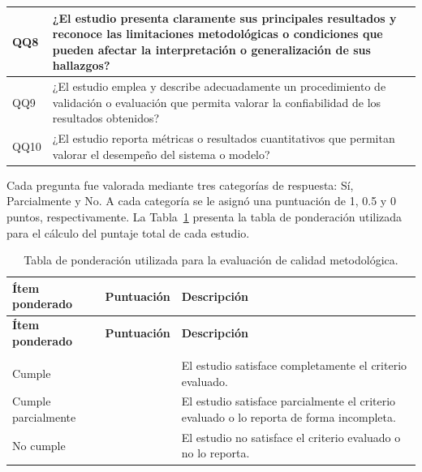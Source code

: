 \documentclass{iaesarticle}
\begin{document}
\begin{longtable}{%
    |>{\centering\arraybackslash}p{}%
    |>{\raggedright\arraybackslash}p{}|}
QQ8 &
¿El estudio presenta claramente sus principales resultados y reconoce las limitaciones metodológicas o condiciones que pueden afectar la interpretación o generalización de sus hallazgos? \\
\hline

QQ9 &
¿El estudio emplea y describe adecuadamente un procedimiento de validación o evaluación que permita valorar la confiabilidad de los resultados obtenidos? \\
\hline

QQ10 &
¿El estudio reporta métricas o resultados cuantitativos que permitan valorar el desempeño del sistema o modelo? \\
\hline

\end{longtable}

\vspace{0.5em}

Cada pregunta fue valorada mediante tres categorías de respuesta: Sí, Parcialmente y No. A cada categoría se le asignó una puntuación de 1, 0.5 y 0 puntos, respectivamente. La Tabla~\ref{tab:ponderacion} presenta la tabla de ponderación utilizada para el cálculo del puntaje total de cada estudio.

\begin{longtable}{%
    |>{\raggedright\arraybackslash}p{}%
    |>{\centering\arraybackslash}p{}%
    |>{\raggedright\arraybackslash}p{}|}
\caption{Tabla de ponderación utilizada para la evaluación de calidad metodológica.}
\label{tab:ponderacion}\\
\hline
\rowcolor{blue!10}
\textbf{Ítem ponderado} &
\textbf{Puntuación} &
\textbf{Descripción} \\
\hline
\endfirsthead

\hline
\rowcolor{blue!10}
\textbf{Ítem ponderado} &
\textbf{Puntuación} &
\textbf{Descripción} \\
\hline
\endhead

\hline
\multicolumn{3}{r|}{\textit{Continúa en la siguiente página}} \\
\endfoot

\hline
\endlastfoot

\scriptsize

Cumple & 1 & El estudio satisface completamente el criterio evaluado. \\ \hline

Cumple parcialmente & 0.5 & El estudio satisface parcialmente el criterio evaluado o lo reporta de forma incompleta. \\ \hline

No cumple & 0 & El estudio no satisface el criterio evaluado o no lo reporta. \\ \hline

\end{longtable}
\end{document}
